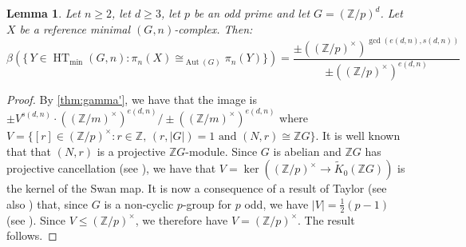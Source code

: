 \documentclass[11pt,a4paper,leqno]{amsart}
\newtheorem{lemma}[theorem]{Lemma}
\theoremstyle{definition}
\theoremstyle{remark}
\newcommand{\wt}{\widetilde}
\newcommand{\Z}{\mathbb{Z}}
\DeclareMathOperator{\Aut}{Aut}
\DeclareMathOperator{\HT}{HT}
\begin{document}
\begin{lemma} \label{lemma:e-s-ex}
Let $n \ge 2$, let $d \ge 3$, let $p$ be an odd prime and let $G = (\Z/p)^d$. Let $X$ be a reference minimal $(G,n)$-complex. Then:
\[ \beta(\{\, Y \in \HT_{\min}(G,n) : \pi_n(X) \cong_{\Aut(G)} \pi_n(Y)\}) = \frac{\pm ((\Z/p)^\times)^{\gcd(e(d,n),s(d,n))}}{\pm ((\Z/p)^\times)^{e(d,n)}}  \]
\end{lemma}

\begin{proof}
By \cref{thm:gamma'}, we have that the image is $\pm V^{s(d,n)} \cdot ((\Z/m)^\times)^{e(d,n)} / \pm ((\Z/m)^\times)^{e(d,n)}$ where $V = \{ [r] \in (\Z/p)^\times : r \in \Z, \, (r,|G|)=1 \text{ and } (N,r) \cong \Z G \}$.
It is well known that that $(N,r)$ is a projective $\Z G$-module. Since $G$ is abelian and $\Z G$ has projective cancellation (see \cite[Lemma 3.2]{Linnell:1993}), we have that $V = \ker((\Z/p)^\times \to \wt K_0(\Z G))$ is the kernel of the Swan map. It is now a consequence of a result of Taylor \cite[Theorem 3]{Ta78} (see also \cite[54.15]{CR87}) that, since $G$ is a non-cyclic $p$-group for $p$ odd, we have $|V| = \frac{1}{2}(p-1)$ (see \cite[Theorem 2.1]{Linnell:1993}). Since $V \le (\Z/p)^\times$, we therefore have $V = (\Z/p)^\times$.  The result follows.
\end{proof}
\end{document}

